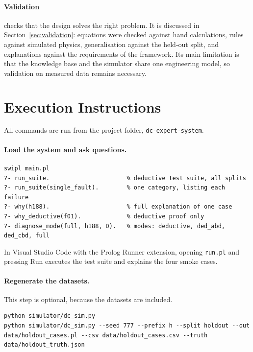 \paragraph{Validation} checks that the design solves the right problem. It is discussed in Section~\ref{sec:validation}: equations were checked against hand calculations, rules against simulated physics, generalisation against the held-out split, and explanations against the requirements of the framework. Its main limitation is that the knowledge base and the simulator share one engineering model, so validation on measured data remains necessary.

\section{Execution Instructions}
\label{sec:execution}

All commands are run from the project folder, \texttt{dc-expert-system}.

\paragraph{Load the system and ask questions.}\mbox{}
\begin{lstlisting}[language={}]
swipl main.pl
?- run_suite.                      % deductive test suite, all splits
?- run_suite(single_fault).        % one category, listing each failure
?- why(h188).                      % full explanation of one case
?- why_deductive(f01).             % deductive proof only
?- diagnose_mode(full, h188, D).   % modes: deductive, ded_abd, ded_cbd, full
\end{lstlisting}
In Visual Studio Code with the Prolog Runner extension, opening \texttt{run.pl} and pressing Run executes the test suite and explains the four smoke cases.

\paragraph{Regenerate the datasets.} This step is optional, because the datasets are included.
\begin{lstlisting}[language={}]
python simulator/dc_sim.py
python simulator/dc_sim.py --seed 777 --prefix h --split holdout --out data/holdout_cases.pl --csv data/holdout_cases.csv --truth data/holdout_truth.json
\end{lstlisting}

